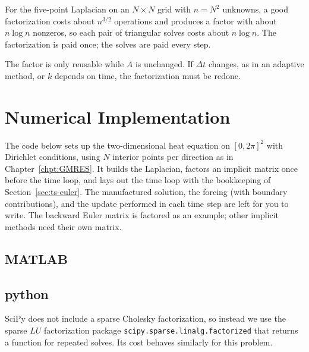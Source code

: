 For the five-point Laplacian on an $N\times N$ grid with $n = N^2$ unknowns, a good factorization costs about $n^{3/2}$ operations and produces a factor with about $n\log n$ nonzeros,
so each pair of triangular solves costs about $n\log n$. The factorization is paid once; the solves
are paid every step.

\begin{remark}
The factor is only reusable while $A$ is unchanged. If $\Delta t$ changes, as in an
adaptive method, or $k$ depends on time, the factorization must be redone.
\end{remark}


\section{Numerical Implementation}
\label{sec:ts-code}

The code below sets up the two-dimensional heat equation on $[0,2\pi]^2$ with Dirichlet
conditions, using $N$ interior points per direction as in Chapter~\ref{chpt:GMRES}. It
builds the Laplacian, factors an implicit matrix once before the time loop, and lays out the
time loop with the bookkeeping of Section~\ref{sec:ts-euler}. The manufactured
solution, the forcing (with boundary contributions), and the update performed in each time step are left for you to write.
The backward Euler matrix is factored as an example; other implicit methods need their own matrix.

\subsection{MATLAB}


\subsection{python}
SciPy does not include a sparse Cholesky factorization, so instead we use
the sparse $LU$ factorization package \texttt{scipy.sparse.linalg.factorized} that returns a
function for repeated solves. Its cost behaves similarly for this problem.

